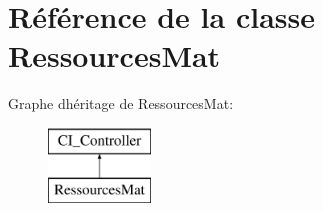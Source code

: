 \hypertarget{class_ressources_mat}{}\section{Référence de la classe Ressources\+Mat}
\label{class_ressources_mat}
Graphe d\textquotesingle{}héritage de Ressources\+Mat\+:\begin{figure}[H]
\begin{center}
\leavevmode
\includegraphics[height=2.000000cm]{class_ressources_mat}
\end{center}
\end{figure}
